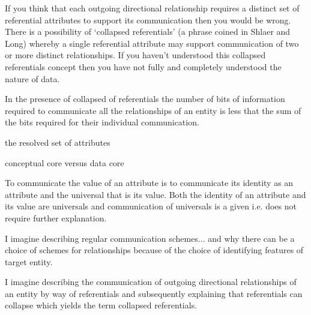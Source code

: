 \mynote If you think that each outgoing directional relationship requires a distinct set of referential attributes to support its communication then you would be wrong. 
There is a possibility of `collapsed referentials' (a phrase coined in Shlaer and Long) whereby a single referential attribute may support communication of two or more distinct relationships. If you haven't understood this collapsed referentials concept then you have not  fully and completely understood the nature of data. 

\mynote In the presence of collapsed of referentials the number of bits of information required to communicate all the relationships of an entity is less that the sum of the bits required for their individual communication. 

\mynote the resolved set of attributes

\mynote conceptual core versus data core

\begin{oldtt}
\mynote To communicate the value of an attribute is to communicate its identity as an attribute and the universal that is its value. Both the identity of an attribute and its value are universals and communication of universals is a given i.e. does not require further explanation. 
\end{oldtt}

\begin{noteforfuture}
I imagine describing regular communication schemes... and why there can be a choice of schemes for relationships because of the choice of identifying features of target entity. 
\end{noteforfuture}
\begin{noteforfuture}
I imagine describing the communication of outgoing directional relationships of an entity by way of referentials and subsequently explaining that referentials can collapse which yields the term collapsed referentials.
\end{noteforfuture}